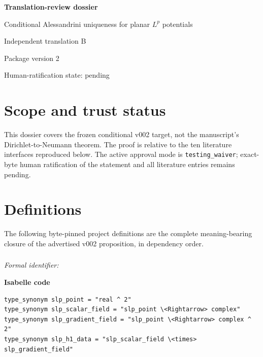 \documentclass[10pt,oneside]{article}
\newcommand{\reviewlabel}[1]{\par\smallskip\noindent\textsf{\bfseries #1}\par\smallskip}
\begin{document}
\begin{titlepage}
\centering
\vspace*{0.15\textheight}
{\LARGE\bfseries Translation-review dossier\par}
\vspace{1.2em}
{\Large Conditional Alessandrini uniqueness for planar \(L^p\) potentials\par}
\vspace{1em}
{\large Independent translation B\par}
\vfill
{Package version 2\par}
{Human-ratification state: pending\par}
\end{titlepage}
\tableofcontents
\clearpage

\section{Scope and trust status}
This dossier covers the frozen conditional v002 target, not the manuscript's
Dirichlet-to-Neumann theorem. The proof is relative to the ten literature
interfaces reproduced below. The active approval mode is
\texttt{testing\_waiver}; exact-byte human ratification of the statement and
all literature entries remains pending.

\section{Definitions}
The following byte-pinned project definitions are the complete meaning-bearing
closure of the advertised v002 proposition, in dependency order.
\subsubsection{\texttt{}}
\noindent\textit{Formal identifier:} \texttt{}

\reviewlabel{Isabelle code}
\begin{lstlisting}
type_synonym slp_point = "real ^ 2"
type_synonym slp_scalar_field = "slp_point \<Rightarrow> complex"
type_synonym slp_gradient_field = "slp_point \<Rightarrow> complex ^ 2"
type_synonym slp_h1_data = "slp_scalar_field \<times> slp_gradient_field"
\end{lstlisting}
\end{document}
